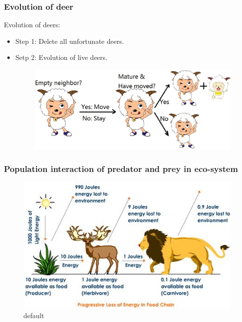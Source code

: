 \documentclass{beamer}
\begin{document}
\frame
{
  	\frametitle{Evolution of deer}
  	Evolution of deers: \\
 	\begin{itemize}
  	\item<1->{Step 1: Delete all unfortunate deers.}
  	\item<2->{Setp 2: Evolution of live deers.
 
  	\begin{figure}[htbp]
 	 \begin{center}
  	\includegraphics[width=\textwidth]{./pics/goat.jpeg}
  	\label{default}
 	 \end{center}
  	\end{figure}
  	}
   	\end{itemize}
}

\frame
{
	\frametitle{Population interaction of predator and prey in eco-system}

	\begin{figure}[htbp]
	\begin{center}
	\includegraphics[width=1\textwidth]{./pics/progressive-energy-loss.jpeg}
	\caption{default}
	\label{default}
	\end{center}
	\end{figure}
}
\end{document}
